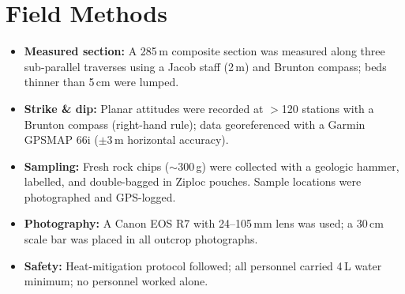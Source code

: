 \section{Field Methods}

\begin{itemize}
  \item \textbf{Measured section:} A 285\,m composite section was measured
        along three sub-parallel traverses using a Jacob staff (2\,m) and
        Brunton compass; beds thinner than 5\,cm were lumped.
  \item \textbf{Strike \& dip:} Planar attitudes were recorded at $>$120 stations
        with a Brunton compass (right-hand rule); data georeferenced with a
        Garmin GPSMAP 66i ($\pm$3\,m horizontal accuracy).
  \item \textbf{Sampling:} Fresh rock chips ($\sim$300\,g) were collected with
        a geologic hammer, labelled, and double-bagged in Ziploc pouches.
        Sample locations were photographed and GPS-logged.
  \item \textbf{Photography:} A Canon EOS R7 with 24--105\,mm lens was used;
        a 30\,cm scale bar was placed in all outcrop photographs.
  \item \textbf{Safety:} Heat-mitigation protocol followed; all personnel
        carried 4\,L water minimum; no personnel worked alone.
\end{itemize}

